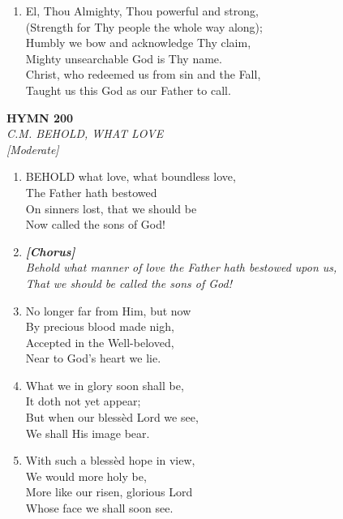 \documentclass[11pt,a4paper]{article}
\begin{document}
\begin{enumerate}
    \item El, Thou Almighty, Thou powerful and strong, \\
        (Strength for Thy people the whole way along); \\
        Humbly we bow and acknowledge Thy claim, \\
        Mighty unsearchable God is Thy name. \\
        Christ, who redeemed us from sin and the Fall, \\
        Taught us this God as our Father to call.

\end{enumerate}

\newpage
\begin{center}
    {\Large \textbf{HYMN 200}}
    \\
    \textit{C.M. BEHOLD, WHAT LOVE}
    \\
    \textit{\small [Moderate]}
\end{center}
\vspace{1em}

\begin{enumerate}
    \item BEHOLD what love, what boundless love, \\
        The Father hath bestowed \\
        On sinners lost, that we should be \\
        Now called the sons of God!

    \item[] \vspace{0.4em}
    \textbf{\textit{[Chorus]}} \\
    \textit{Behold what manner of love the Father hath bestowed upon us,} \\
    \textit{That we should be called the sons of God!}
    \vspace{0.4em}

    \item No longer far from Him, but now \\
        By precious blood made nigh, \\
        Accepted in the Well-beloved, \\
        Near to God's heart we lie.

    \item What we in glory soon shall be, \\
        It doth not yet appear; \\
        But when our bless\`ed Lord we see, \\
        We shall His image bear.

    \item With such a bless\`ed hope in view, \\
        We would more holy be, \\
        More like our risen, glorious Lord \\
        Whose face we shall soon see.

\end{enumerate}
\end{document}
